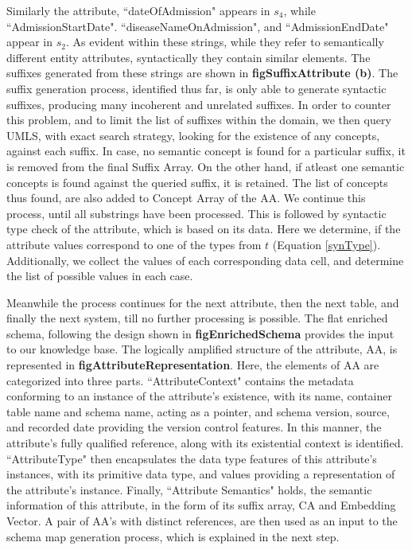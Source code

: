 Similarly the attribute, ``dateOfAdmission" appears in $s_4$, while ``AdmissionStartDate". ``diseaseNameOnAdmission", and ``AdmissionEndDate" appear in $s_2$. As evident within these strings, while they refer to semantically different entity attributes, syntactically they contain similar elements. The suffixes generated from these strings are shown in \textbf{figSuffixAttribute (b)}. The suffix generation process, identified thus far, is only able to generate syntactic suffixes, producing many incoherent and unrelated suffixes. In order to counter this problem, and to limit the list of suffixes within the domain, we then query UMLS, with exact search strategy, looking for the existence of any concepts, against each suffix. In case, no semantic concept is found for a particular suffix, it is removed from the final Suffix Array. On the other hand, if atleast one semantic concepts is found against the queried suffix, it is retained. The list of concepts thus found, are also added to Concept Array of the AA. We continue this process, until all substrings have been processed. This is followed by syntactic type check of the attribute, which is based on its data. Here we determine, if the attribute values correspond to one of the types from $t$ (Equation \eqref{synType}). Additionally, we collect the values of each corresponding data cell, and determine the list of possible values in each case. 

Meanwhile the process continues for the next attribute, then the next table, and finally the next system, till no further processing is possible. The flat enriched schema, following the design shown in \textbf{figEnrichedSchema} provides the input to our knowledge base. The logically amplified structure of the attribute, AA, is represented in \textbf{figAttributeRepresentation}. Here, the elements of AA are categorized into three parts. ``AttributeContext" contains the metadata conforming to an instance of the attribute's existence,  with its name, container table name and schema name, acting as a pointer, and schema version, source, and recorded date providing the version control features. In this manner, the attribute's fully qualified reference, along with its existential context is identified. ``AttributeType" then encapsulates the data type features of this attribute's instances, with its primitive data type, and values providing a representation of the attribute's instance. Finally, ``Attribute Semantics" holds, the semantic information of this attribute, in the form of its suffix array, CA and Embedding Vector.
A pair of AA's with distinct references, are then used as an input to the schema map generation process, which is explained in the next step.

